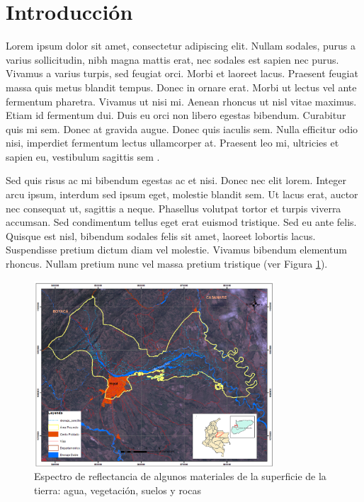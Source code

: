 \documentclass[artMGITG,SIG,accept,moreauthors,font4]{mgitg}
\begin{document}
%
\section{Introducción}
%
\noindent
Lorem ipsum dolor sit amet, consectetur adipiscing elit. Nullam sodales, purus a varius sollicitudin, nibh magna mattis erat, nec sodales est sapien nec purus. Vivamus a varius turpis, sed feugiat orci. Morbi et laoreet lacus. Praesent feugiat massa quis metus blandit tempus. Donec in ornare erat. Morbi ut lectus vel ante fermentum pharetra. Vivamus ut nisi mi. Aenean rhoncus ut nisl vitae maximus. Etiam id fermentum dui. Duis eu orci non libero egestas bibendum. Curabitur quis mi sem. Donec at gravida augue. Donec quis iaculis sem. Nulla efficitur odio nisi, imperdiet fermentum lectus ullamcorper at. Praesent leo mi, ultricies et sapien eu, vestibulum sagittis sem \cite{Ref01,Ref12,Ref13}.

Sed quis risus ac mi bibendum egestas ac et nisi. Donec nec elit lorem. Integer arcu ipsum, interdum sed ipsum eget, molestie blandit sem. Ut lacus erat, auctor nec consequat ut, sagittis a neque. Phasellus volutpat tortor et turpis viverra accumsan. Sed condimentum tellus eget erat euismod tristique. Sed eu ante felis. Quisque est nisl, bibendum sodales felis sit amet, laoreet lobortis lacus. Suspendisse pretium dictum diam vel molestie. Vivamus bibendum elementum rhoncus. Nullam pretium nunc vel massa pretium tristique (ver Figura \ref{fig1}). 

\begin{figure}[!ht]
    \centering
    \includegraphics[width=0.8\textwidth]{figuras/figura1}
    \caption{Espectro de reflectancia de algunos materiales de la superficie de la tierra: agua, vegetación, suelos y rocas}
    \label{fig1}
\end{figure}
\end{document}
